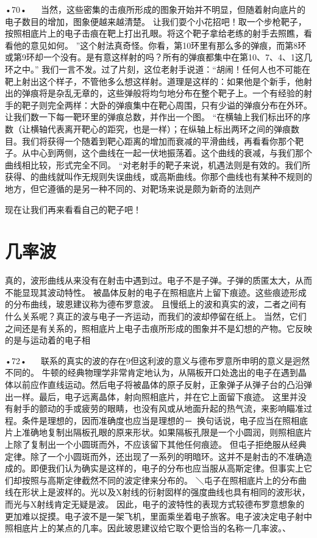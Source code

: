 •70•
  
当然，这些密集的击痕所形成的图象开始并不明显，但随着射向底片的电子数目的增加，图象便越来越清楚。
让我们耍个小花招吧！取一个步枪靶子，按照相底片上的电子击痕在靶上打出孔眼。将这个靶子拿给老练的射手去照瞧，看看他的意见如何。
”这个射法真奇怪。你看，第10环里有那么多的弹痕，而第8环或第9环却一个没有。是有意这样射的吗？所有的弹痕都集中在第10、7、4、1这几环之中。”
我们一言不发。过了片刻，这位老射手说道：“胡闹！任何人也不可能在靶上射出这个样子，不管他多么想这样射。道理是这样的：如果他是个新手，他射出的弹痕将是杂乱无章的，这些弹般将均匀地分布在整个靶子上。一个有经验的射手的靶子则完全两样：大卧的弹痕集中在靶心周围，只有少谥的弹痕分布在外环。让我们数一下每一靶环里的弹痕总数，并作出一个图。
“在横轴上我们标出环的序数（让横轴代表离开靶心的距究，也是一样）；在纵轴上标出两环之间的弹痕数目。我们将获得一个随着到靶心距离的增加而衰减的平滑曲线，再看看你那个靶子。从中心到两侧，这个曲线在一起一伏地振荡着。这个曲线的衰减，与我们那个曲线相比较，形式完全不同。
“对老射手的靶子来说，机遇法则是有效的。我们所获得、的曲线就叫作无规则失误曲线，或高斯曲线。你那个曲线也有某种不规则的地方，但它遵循的是另一种不同的、对靶场来说是颇为新奇的法则产


现在让我们再来看看自己的靶子吧！

\section{几率波}

真的，波形曲线从来没有在射击中遇到过。电子不是子弹。子弹的质匿太大，从而不能显现其波动特性。
被晶体反射的电子在照相底片上留下痕迹。这些痕迹形成的分布曲线，玻恩建议称为德布罗意波。
且慢纸上的波和真实的波，二者之间有什么关系呢？真正的波与电子一齐运动，而我们的波却停留在纸上。
当然，它们之间还是有关系的，照相底片上电子击痕所形成的图象并不是幻想的产物。它反映的是与运动着的电子相

•72•
  
联系的真实的波的存在9但这利波的意义与德布罗意所申明的意义是迥然不同的。
牛顿的经典物理学非常肯定地认为，从隔板开口处逸出的电子在遇到晶体以前应作直线运动。然后电子将被晶体的原子反射，正象弹子从弹子台的凸沿弹出一样。最后，电子远离晶体，射向照相底片，并在它上面留下痕迹。
这里并没有射手的颤动的手或疲劳的眼睛，也没有风或从地面升起的热气流，来影响瞄准过程。条件是理想的，因而准确度也应当是理想的－~换句话说，电子应当在照相底片上准确地复制出隔板孔眼的原来形状。如果隔板孔限是一个小圆润，则照相底片上除了复制出一个小圆斑而外，不应该留下其他任何痕迹。
但屯子拒绝服从经典定律。除了一个小圆斑而外，还出现了一系列的明暗环。这并不是射击的不准确造成的。即便我们认为确实是这样的，电子的分布也应当服从高斯定律。但事实上它们却按照与高斯定律截然不同的波定律来分布的。
＼屯子在照相底片上的分布曲线在形状上是波样的。光以及X射线的衍射囡样的强度曲线也具有相同的波形状，而光与X射线肯定无疑是波。
因此，电子的波特性的表现方式较德布罗意想象的更加难以捉摸。电子波不是一架飞机，里面乘坐着电子旅客。电子波决定电子射中照相底片上的某点的几率。因此玻恩建议给它取个更恰当的名称一几率波。、

